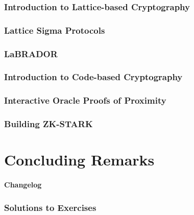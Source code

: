 \documentclass{config/zkdl-template}
\begin{document}
    \section{Introduction to Lattice-based Cryptography}\label{section:lattices}
    

    \section{Lattice Sigma Protocols}\label{section:lattice-sigma-protocols}
    

    \section{LaBRADOR}\label{section:labrador}
    

    \section{Introduction to Code-based Cryptography}\label{section:linear-codes}
    

    \section{Interactive Oracle Proofs of Proximity}\label{section:iopp}
    

    \section{Building ZK-STARK}\label{section:zk-stark}
    
   
     
    

    \part{Concluding Remarks}\label{section:solutions}

    \subsection*{Changelog}
    

    \section*{Solutions to Exercises}
    

    
\end{document}
